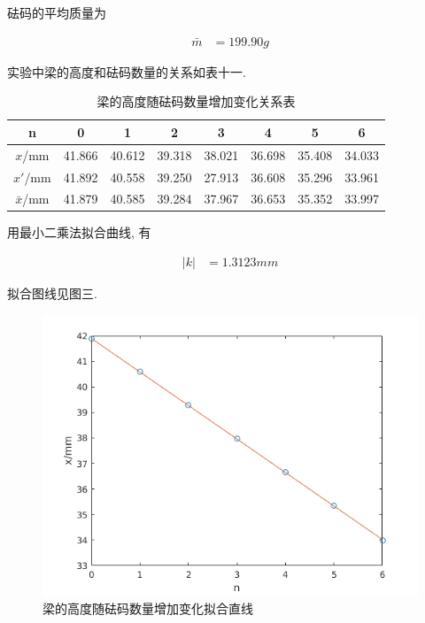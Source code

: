 \documentclass[a4paper,10pt,notitlepage]{article}
\begin{document}
	砝码的平均质量为
	
\begin{align*}
	\bar{m} &= 199.90 g
\end{align*}

	实验中梁的高度和砝码数量的关系如表十一. \\
	
\begin{center}

	\begin{longtable}{|c|c|c|c|c|c|c|c|}
	\caption{梁的高度随砝码数量增加变化关系表} \\
	\hline
	n & 0 & 1 & 2 & 3 & 4 & 5 & 6 \\
	\hline
	$x$/mm & 41.866 & 40.612 & 39.318 & 38.021 & 36.698 & 35.408 & 34.033 \\
	\hline
	$x'$/mm & 41.892 & 40.558 & 39.250 & 27.913 & 36.608 & 35.296 & 33.961 \\
	\hline
	$\bar{x}$/mm & 41.879 & 40.585 & 39.284 & 37.967 & 36.653 & 35.352 & 33.997 \\
	\hline
	\end{longtable}

\end{center}

	用最小二乘法拟合曲线, 有
	
\begin{align*}
	|k| &= 1.3123mm
\end{align*}

	拟合图线见图三. \\
	
\begin{figure}[h]
\centering
	\includegraphics[scale=0.7]{ym3.png}
	\caption{梁的高度随砝码数量增加变化拟合直线}
\end{figure}
\end{document}
